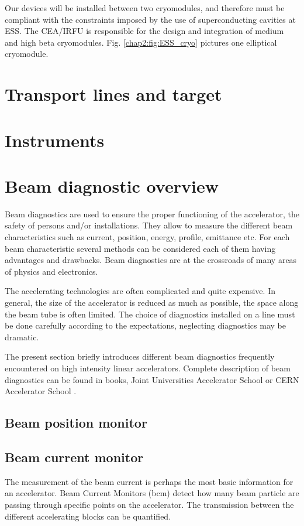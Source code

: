 \begin{refsection}
  Our devices will be installed between two cryomodules, and therefore must be compliant with the constraints imposed by the use of superconducting cavities at ESS. The CEA/IRFU is responsible for the design and integration of medium and high beta cryomodules. Fig. \ref{chap2:fig:ESS_cryo} pictures one elliptical cryomodule.

  

  \section{Transport lines and target}

  

  \section{Instruments}

  \section{Beam diagnostic overview}
  Beam diagnostics are used to ensure the proper functioning of the accelerator, the safety of persons and/or installations. They allow to measure the different beam characteristics such as current, position, energy, profile, emittance etc. For each beam characteristic several methods can be considered each of them having advantages and drawbacks. Beam diagnostics are at the crossroads of many areas of physics and electronics.

  The accelerating technologies are often complicated and quite expensive. In general, the size of the accelerator is reduced as much as possible, the space along the beam tube is often limited. The choice of diagnostics installed on a line must be done carefully according to the expectations, neglecting diagnostics may be dramatic.

  The present section briefly introduces different beam diagnostics frequently encountered on high intensity linear accelerators. Complete description of beam diagnostics can be found in books\cite{strehl2006}, Joint Universities Accelerator School \cite{juas2019} or CERN Accelerator School \cite{cas2019}.

  \subsection{Beam position monitor}
  \subsection{Beam current monitor}
  The measurement of the beam current is perhaps the most basic information for an accelerator. Beam Current Monitors (\acrshort{bcm}) detect how many beam particle are passing through specific points on the accelerator. The transmission between the different accelerating blocks can be quantified.


\end{refsection}
